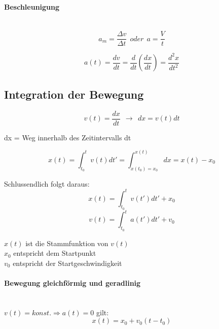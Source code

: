 \documentclass[7pt]{article}
\begin{document}
\begin{multicols}{3}
\paragraph{Beschleunigung}\mbox{} \\
\begin{equation*}
	a_m = \frac{{\Delta}v}{{\Delta}t} \>\>oder\>\> a = \frac{V}{t}
\end{equation*}

\begin{equation*}
a(t) = \frac{dv}{dt} = \frac{d}{dt} \left(\frac{dx}{dt}\right) = \frac{d^2x}{dt^2}
\end{equation*}


\subsection{Integration der Bewegung}
\begin{equation*}
	v(t) = \frac{dx}{dt} \>\> \rightarrow \>\> dx = v(t)dt
\end{equation*}
\begin{center}
dx =  Weg innerhalb des Zeitintervalls dt\newline
\end{center}

\begin{equation*}
	x(t) = \int_{t_0}^{t}v(t)dt' = \int_{x(t_0)=x_0}^{x(t)}dx = x(t) - x_0
\end{equation*}
\newline

Schlussendlich folgt daraus:
\begin{equation*}
	x(t) = \int_{t_0}^{t}v(t')dt' + x_0
\end{equation*}
\begin{equation*}
	v(t) = \int_{t_0}^{t}a(t')dt' + v_0
\end{equation*}

$x(t)$ ist die Stammfunktion von $v(t)$ \\
$x_0$ entspricht dem Startpunkt \\
$v_0$ entspricht der Startgeschwindigkeit\newline

\paragraph{Bewegung gleichf{\"o}rmig und geradlinig}\mbox{} \\
$v(t) = konst. \Rightarrow a(t) = 0$ gilt:\newline
\begin{equation*}
	x(t) = x_0 + v_0(t - t_0)
\end{equation*}

\end{multicols}
\end{document}
